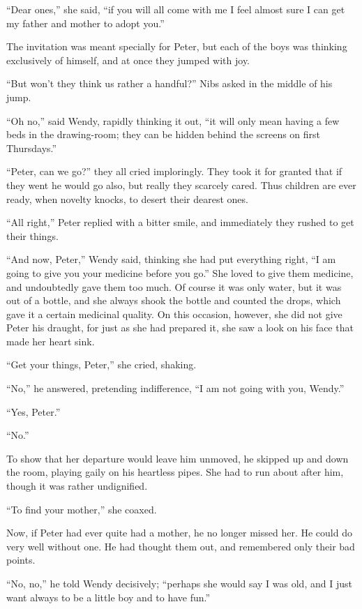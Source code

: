 ``Dear ones,'' she said, ``if you will all come with me I feel almost sure
I can get my father and mother to adopt you.''

The invitation was meant specially for Peter, but each of the boys was
thinking exclusively of himself, and at once they jumped with joy.

``But won't they think us rather a handful?'' Nibs asked in the middle of
his jump.

``Oh no,'' said Wendy, rapidly thinking it out, ``it will only mean having
a few beds in the drawing-room; they can be hidden behind the screens
on first Thursdays.''

``Peter, can we go?'' they all cried imploringly. They took it for
granted that if they went he would go also, but really they scarcely
cared. Thus children are ever ready, when novelty knocks, to desert
their dearest ones.

``All right,'' Peter replied with a bitter smile, and immediately they
rushed to get their things.

``And now, Peter,'' Wendy said, thinking she had put everything right, ``I
am going to give you your medicine before you go.'' She loved to give
them medicine, and undoubtedly gave them too much. Of course it was
only water, but it was out of a bottle, and she always shook the bottle
and counted the drops, which gave it a certain medicinal quality. On
this occasion, however, she did not give Peter his draught, for just as
she had prepared it, she saw a look on his face that made her heart
sink.

``Get your things, Peter,'' she cried, shaking.

``No,'' he answered, pretending indifference, ``I am not going with you,
Wendy.''

``Yes, Peter.''

``No.''

To show that her departure would leave him unmoved, he skipped up and
down the room, playing gaily on his heartless pipes. She had to run
about after him, though it was rather undignified.

``To find your mother,'' she coaxed.

Now, if Peter had ever quite had a mother, he no longer missed her. He
could do very well without one. He had thought them out, and remembered
only their bad points.

``No, no,'' he told Wendy decisively; ``perhaps she would say I was old,
and I just want always to be a little boy and to have fun.''

